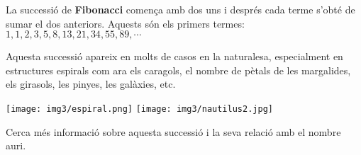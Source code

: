 \begin{blueshaded}
	
	La successió de \textbf{Fibonacci} comença amb dos uns i després cada terme s'obté de sumar el dos anteriors. Aquests són els primers termes:
	$
	 1, 1, 2, 3, 5, 8, 13, 21, 34, 55, 89, \cdots
	$
	
	Aquesta successió apareix en molts de casos en la naturalesa, especialment en estructures espirals com ara els caragols, el nombre de pètals de les margalides, els girasols, les pinyes, les galàxies, etc.
	
	\vspace{0.25cm}
	
	\begin{center}
		\texttt{[image: img3/espiral.png]}
		\texttt{[image: img3/nautilus2.jpg]}
	\end{center}

Cerca més informació sobre aquesta successió i  la seva relació amb el nombre auri.
	
	\begin{comment}
	Aquesta successió té una propietat curiosa. Si dividim dos termes consecutius trobam la successió:
	
	\[1, 2, 1.5, 1.6, 1.625, 1.6154, 1.619, 1.617, \cdots\]
	
	Resulta que aquesta successió s'acosta a un nombre que és tan important que se li va donar un nom (\textbf{el nombre auri}) $\Phi = \frac{1+\sqrt{5}}{2} = 1.618034 \cdots$
	\end{comment}
\end{blueshaded}

\newpage
\resum 

